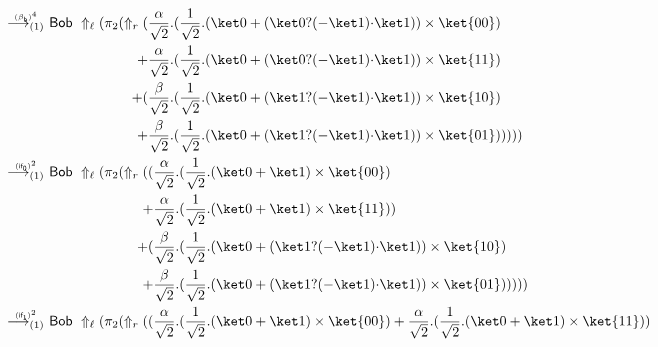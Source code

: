\documentclass[preprint]{elsarticle}
\newcommand\lra[1][1]{\longrightarrow_{\left(#1\right)}}
\newcommand\ite[3]{{#1}?{#2}\mathord{\cdot}{#3}}
\newcommand\pair[2]{({#1}+{#2})}
\newcommand\s[1]{\ensuremath{\mathsf{#1}}}
\newcommand\red[2][1]{\overset{\scriptscriptstyle\smash{#2}\vphantom{x}}{\lra[#1]}\ }
\newcommand\rbetab{(\s{\beta_b})}
\newcommand\riftrue{(\s{if_{1}})}
\newcommand\riffalse{(\s{if_{0}})}
\begin{document}
\begin{align*}
\begin{aligned}[t]
                   \end{aligned}
  \\
  \red{\rbetab^4} &
                    \begin{aligned}[t]
                      \s{Bob}\ \Uparrow_\ell(\pi_2(\Uparrow_r  ( & {
                        \frac{\alpha}{\sqrt 2}.(\frac 1{\sqrt 2}.( \ket
                        0+(\ite{\ket 0}{(-\ket 1)}{\ket 1}) )\times\ket{00}) }
                      \\
                      + & { \frac{\alpha}{\sqrt 2}.(\frac 1{\sqrt 2}.( \ket
                        0+(\ite{\ket 0}{(-\ket 1)}{\ket 1}) )\times\ket{11}) }
                      \\
                      + ( & { \frac{\beta}{\sqrt 2}.(\frac 1{\sqrt 2}.( \ket
                        0+(\ite{\ket 1}{(-\ket 1)}{\ket 1}) )\times\ket{10}) }
                      \\
                      + & { \frac{\beta}{\sqrt 2}.(\frac 1{\sqrt 2}.( \ket
                        0+(\ite{\ket 1}{(-\ket 1)}{\ket 1}) )\times\ket{01}) }
                      ) ) ) )
                    \end{aligned}
  \\
  \red{\riffalse^2} &
                      \begin{aligned}[t]
                        \s{Bob}\ \Uparrow_\ell(\pi_2(\Uparrow_r  ( (
                        & {\frac{\alpha}{\sqrt 2}.(\frac 1{\sqrt 2}.( \ket 0+\ket 1)\times\ket{00}) }\\
                        +& {\frac{\alpha}{\sqrt 2}.(\frac 1{\sqrt 2}.( \ket 0+\ket 1)\times\ket{11}) }) \\
                        + ( & {\frac{\beta}{\sqrt 2}.(\frac 1{\sqrt 2}.( \ket 0+(\ite{\ket 1}{(-\ket 1)}{\ket 1}))\times\ket{10}) }\\
                        +& {\frac{\beta}{\sqrt 2}.(\frac 1{\sqrt 2}.( \ket
                          0+(\ite{\ket 1}{(-\ket 1)}{\ket 1}))\times\ket{01})
                        }))))
                      \end{aligned}
  \\
  \red{\riftrue^2} &
                     \begin{aligned}[t]
                       \s{Bob}\ \Uparrow_\ell(\pi_2(\Uparrow_r  ( &\pair
                       {\frac{\alpha}{\sqrt 2}.(\frac 1{\sqrt 2}.\pair{\ket
                           0}{\ket 1}\times\ket{00})} {\frac{\alpha}{\sqrt
                           2}.(\frac 1{\sqrt 2}.\pair{\ket 0}{\ket
                           1}\times\ket{11})}

\end{aligned}
\end{align*}
\end{document}
